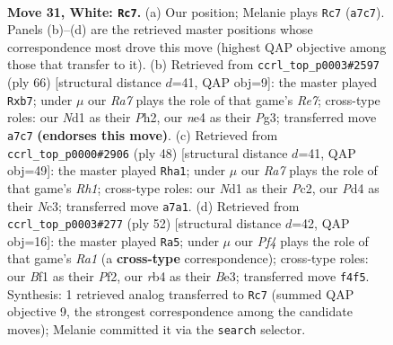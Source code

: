 \documentclass[11pt]{article}
\begin{document}
\clearpage

\begin{figure}[p]\centering
\begin{subfigure}{0.46\textwidth}\centering
\resizebox{\linewidth}{!}{%
\newchessgame
\chessboard[
  setfen={6k1/R4pp1/2b1p3/1p5p/1r1PnP1P/4P1P1/8/3N1BK1 w - - 0 31},
  showmover=false,
  pgfstyle=straightmove, color=movearrow, markmove={a7-c7}
]}
\caption{}
\end{subfigure}\hfill
\begin{subfigure}{0.46\textwidth}\centering
\resizebox{\linewidth}{!}{%
\newchessgame
\chessboard[
  setfen={3rb1k1/1p2Rpp1/pN5p/P2P4/3n4/6P1/7P/5BK1 w - - 5 34},
  showmover=false,
  pgfstyle=straightmove, color=movearrow, markmove={e7-b7}
]}
\caption{}
\end{subfigure}
\\[4pt]
\begin{subfigure}{0.46\textwidth}\centering
\resizebox{\linewidth}{!}{%
\newchessgame
\chessboard[
  setfen={2r3k1/4bp1p/R2pp3/4n1p1/4P3/2N2P2/1PP2K2/7R w - - 1 25},
  showmover=false,
  pgfstyle=straightmove, color=movearrow, markmove={h1-a1}
]}
\caption{}
\end{subfigure}\hfill
\begin{subfigure}{0.46\textwidth}\centering
\resizebox{\linewidth}{!}{%
\newchessgame
\chessboard[
  setfen={1r6/2N1bppk/4p3/2n1P2p/2p5/4B1P1/1P2PP1P/R5K1 w - - 3 27},
  showmover=false,
  pgfstyle=straightmove, color=movearrow, markmove={a1-a5}
]}
\caption{}
\end{subfigure}
\caption{\textbf{Move 31, White: \texttt{Rc7}.} (a) Our position; Melanie plays \texttt{Rc7} (\texttt{a7c7}). Panels (b)--(d) are the retrieved master positions whose correspondence most drove this move (highest QAP objective among those that transfer to it). (b) Retrieved from \texttt{ccrl\_top\_p0003\#2597} (ply 66) [structural distance $d$=41, QAP obj=9]: the master played \texttt{Rxb7}; under $\mu$ our \emph{Ra7} plays the role of that game's \emph{Re7}; cross-type roles: our \emph{N}d1 as their \emph{P}h2, our \emph{n}e4 as their \emph{P}g3; transferred move \texttt{a7c7} \textbf{(endorses this move)}. (c) Retrieved from \texttt{ccrl\_top\_p0000\#2906} (ply 48) [structural distance $d$=41, QAP obj=49]: the master played \texttt{Rha1}; under $\mu$ our \emph{Ra7} plays the role of that game's \emph{Rh1}; cross-type roles: our \emph{N}d1 as their \emph{P}c2, our \emph{P}d4 as their \emph{N}c3; transferred move \texttt{a7a1}. (d) Retrieved from \texttt{ccrl\_top\_p0003\#277} (ply 52) [structural distance $d$=42, QAP obj=16]: the master played \texttt{Ra5}; under $\mu$ our \emph{Pf4} plays the role of that game's \emph{Ra1} (a \textbf{cross-type} correspondence); cross-type roles: our \emph{B}f1 as their \emph{P}f2, our \emph{r}b4 as their \emph{B}e3; transferred move \texttt{f4f5}. Synthesis: 1 retrieved analog transferred to \texttt{Rc7} (summed QAP objective 9, the strongest correspondence among the candidate moves); Melanie committed it via the \texttt{search} selector.}
\label{fig:thought-m60}
\end{figure}
\end{document}
